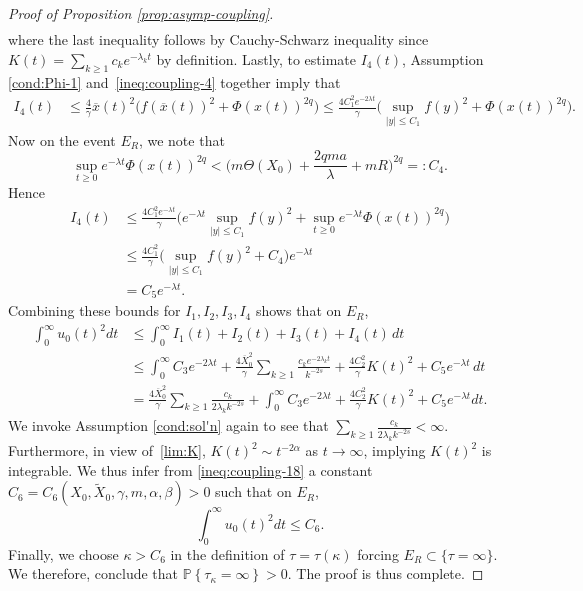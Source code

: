 \documentclass[11pt]{amsart}
\theoremstyle{definition}
\newcommand{\Xtil}{\widetilde{X}}
\newcommand{\Xbar}{\overline{X}}
\newcommand{\xbar}{\overline{x}}
\renewcommand{\P}[1]{\mathbb{P}\left\{#1\right\}}
\theoremstyle{definition}
\theoremstyle{plain}
\numberwithin{equation}{section}
\begin{document}
\begin{proof}[Proof of Proposition \ref{prop:asymp-coupling}]
\begin{align*}
\end{align*}
where the last inequality follows by Cauchy-Schwarz inequality since $K(t)=\sum_{k\geq 1}c_ke^{-\lambda_k t}$ by definition. Lastly, to estimate $I_4(t)$, Assumption \ref{cond:Phi-1} and~\eqref{ineq:coupling-4} together imply that
\begin{align*}
I_4(t) &\leq \frac{4}{\gamma}\xbar(t)^2\big(f\left(\xbar(t)\right)^2+\Phi(x(t))^{2q}\big)\leq \frac{4C_1^2e^{-2\lambda t}}{\gamma}\Big(\sup_{|y|\leq C_1}f\left(y\right)^2+\Phi(x(t))^{2q}\Big).
\end{align*}
Now on the event $E_{R}$, we note that
\begin{equation*}
\sup_{t\geq 0}e^{-\lambda t}\Phi(x(t))^{2q} <\Big(m \Theta(X_0)+\frac{2qma}{\lambda}+m R\Big)^{2q}=:C_4.
\end{equation*}
Hence
\begin{equation*}
\begin{aligned}
I_4(t) &\leq \frac{4C_1^2e^{-\lambda t}}{\gamma}\Big(e^{-\lambda t}\sup_{|y|\leq C_1}f\left(y\right)^2+\sup_{t\geq 0}e^{-\lambda t}\Phi(x(t))^{2q}\Big)\\
&\leq\frac{4C_1^2}{\gamma}\Big(\sup_{|y|\leq C_1}f\left(y\right)^2+C_4\Big)e^{-\lambda t}\\
&=C_5 e^{-\lambda t}.
\end{aligned}
\end{equation*}
Combining these bounds for $I_1, I_2, I_3, I_4$ shows that on $E_R$,
\begin{equation} \label{ineq:coupling-18}
\begin{aligned}
\int_0^\infty u_0(t)^2 dt &\leq \int_0^\infty I_1(t)+I_2(t) +I_3(t) +I_4(t) \, dt \\
&\leq \int_0^\infty C_3 e^{-2\lambda t}+\frac{4\Xbar_0^2}{\gamma}\sum_{k\geq 1}\frac{c_k e^{-2\lambda_k t}}{k^{-2s}}+\frac{4C_2^2}{\gamma}K(t)^2+C_5e^{-\lambda t} \, dt\\
&= \frac{4\Xbar_0^2}{\gamma}\sum_{k\geq 1}\frac{c_k}{2\lambda_k k^{-2s}}+\int_0^\infty C_3 e^{-2\lambda t}+\frac{4C_2^2}{\gamma}K(t)^2+C_5e^{-\lambda t} dt.
\end{aligned}
\end{equation}
We invoke Assumption \ref{cond:sol'n} again to see that $\sum_{k\geq 1}\frac{c_k}{2\lambda_k k^{-2s}}<\infty$. Furthermore, in view of~\eqref{lim:K}, $K(t)^2\sim t^{-2\alpha}$ as $t\to\infty$, implying $K(t)^2$ is integrable. We thus infer from \eqref{ineq:coupling-18} a constant $C_6=C_6(X_0,\Xtil_0,\gamma,m,\alpha,\beta)>0$ such that on $E_R$, 
\begin{equation} \label{ineq:coupling-19}
\int_0^\infty u_0(t)^2 dt \leq C_6.
\end{equation}
Finally, we choose $\kappa>C_6$ in the definition of $\tau=\tau(\kappa)$ forcing $E_R\subset\{\tau=\infty\} $. We therefore, conclude that $\P{\tau_\kappa=\infty}>0$. The proof is thus complete. 
\end{proof}
\end{document}
